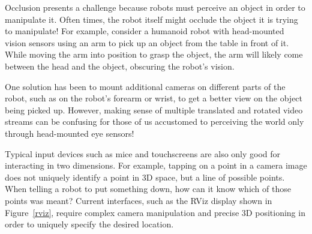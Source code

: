 \documentclass[10pt,twocolumn]{article}
\begin{document}
Occlusion presents a challenge because robots must perceive an object in order to manipulate it.  Often times, the robot itself might occlude the object it is trying to manipulate! For example, consider a humanoid robot with head-mounted vision sensors using an arm to pick up an object from the table in front of it. While moving the arm into position to grasp the object, the arm will likely come between the head and the object, obscuring the robot's vision.

One solution has been to mount additional cameras on different parts of the robot, such as on the robot's forearm or wrist, to get a better view on the object being picked up. However, making sense of multiple translated and rotated video streams can be confusing for those of us accustomed to perceiving the world only through head-mounted eye sensors!

Typical input devices such as mice and touchscreens are also only good for interacting in two dimensions. For example, tapping on a point in a camera image does not uniquely identify a point in 3D space, but a line of possible points. When telling a robot to put something down, how can it know which of those points was meant? Current interfaces, such as the RViz display shown in Figure~\ref{rviz}, require complex camera manipulation and precise 3D positioning in order to uniquely specify the desired location.
\end{document}
